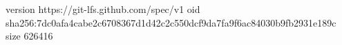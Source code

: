 version https://git-lfs.github.com/spec/v1
oid sha256:7dc0afa4cabe2c6708367d1d42c2c550dcf9da7fa9f6ac84030b9fb2931e189c
size 626416
